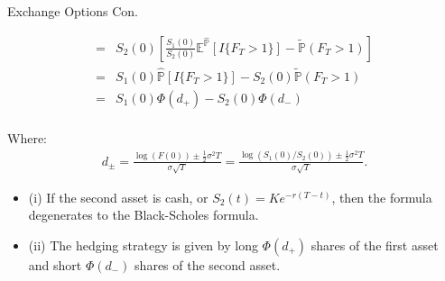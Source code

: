 \documentclass{beamer}
\begin{document}
\begin{frame}{Exchange Options Con.}
    
    {\footnotesize \footnotesize   
    \begin{align*}
        = &  S_2(0) \left[ \frac{S_1(0)}{S_2(0)}\mathbb{E}^{\hat{\mathbb{P}}}[ I{\{F_T > 1\}}] 
        - \tilde{\mathbb{P}}(F_T > 1)\right] \\
        = & S_1(0)\hat{\mathbb{P}}[ I{\{F_T > 1\}}] 
        - S_2(0)\tilde{\mathbb{P}}(F_T > 1) \\
        = & S_1(0) \Phi (d_+) - S_2(0) \Phi (d_-) \\
    \end{align*}
    \par Where:
    \begin{align*}
        d_\pm = \frac{\log(F(0)) \pm \frac{1}{2} \sigma^2 T}{\sigma \sqrt{T}} 
        = \frac{\log(S_1(0)/S_2(0)) \pm \frac{1}{2} \sigma^2 T}{\sigma \sqrt{T}}.
    \end{align*}
    \begin{itemize}
        \item (i) If the second asset is cash, or \( S_2(t) = Ke^{-r(T-t)} \), 
        then the formula degenerates to the Black-Scholes formula.
        \item (ii) The hedging strategy is given by long \( \Phi(d_+) \) 
        shares of the first asset and short \( \Phi(d_-) \) shares of the second asset.
    \end{itemize}
    }
    
\end{frame}
\end{document}

